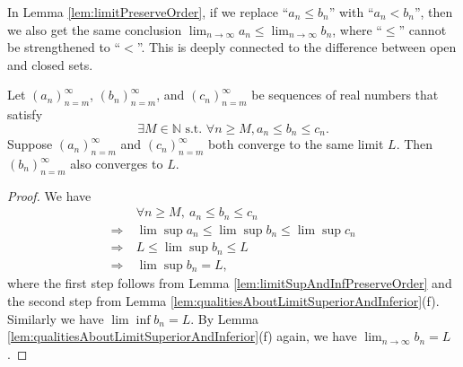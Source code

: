 \begin{rem}
  In Lemma \ref{lem:limitPreserveOrder}, if we
  replace ``$a_{n}\le b_{n}$'' with ``$a_{n}<b_{n}$'',
  then we also get the same conclusion
  $\lim_{n\rightarrow \infty} a_n\le \lim_{n\rightarrow  \infty} b_n$, 
  where ``$\le$'' cannot be strengthened to ``$<$''.
  This is deeply connected to the difference between
  open and closed sets.
\end{rem}


\begin{thm}
  \label{thm:squeezeTest}
  Let $(a_n)_{n=m}^{\infty}$, $(b_n)_{n=m}^{\infty}$,
  and $(c_n)_{n=m}^{\infty}$ be sequences of real numbers
  that satisfy
  \begin{displaymath}
    \exists M\in \mathbb{N} \text{ s.t. }
    \forall n\ge M, a_n\le b_n \le c_n.
  \end{displaymath}
  Suppose $(a_n)_{n=m}^{\infty}$ and $(c_n)_{n=m}^{\infty}$
  both converge to the same limit $L$.
  Then $(b_n)_{n=m}^{\infty}$ also converges to $L$.
\end{thm}
\begin{proof}
  We have
  \begin{align*}
    &\ \forall n\ge M,\ a_{n} \le b_{n}\le c_{n}
    \\ \Rightarrow
    &\ \lim\sup a_{n}\le \lim\sup b_{n}\le \lim\sup c_{n}
    \\ \Rightarrow
    &\ L\le \lim\sup b_{n}\le L
    \\ \Rightarrow
    &\ \lim\sup b_{n} =L,
  \end{align*}
  where the first step follows from
  Lemma \ref{lem:limitSupAndInfPreserveOrder} and the second step from
  Lemma \ref{lem:qualitiesAboutLimitSuperiorAndInferior}(f).
  Similarly we have $\lim\inf b_{n}=L.$ By Lemma
  \ref{lem:qualitiesAboutLimitSuperiorAndInferior}(f) again,
  we have $\lim_{n\rightarrow \infty}b_{n}=L$.
\end{proof}

